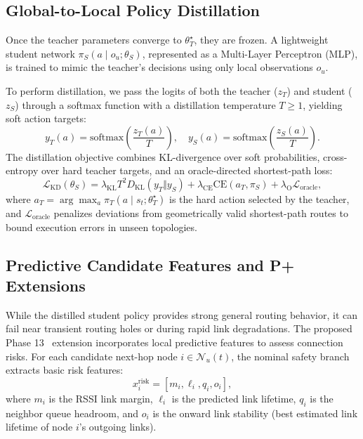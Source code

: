 \subsection{Global-to-Local Policy Distillation}
Once the teacher parameters converge to $\theta_T^\star$, they are frozen. A lightweight student network $\pi_S(a \mid o_u; \theta_S)$, represented as a Multi-Layer Perceptron (MLP), is trained to mimic the teacher's decisions using only local observations $o_u$. 

To perform distillation, we pass the logits of both the teacher ($z_T$) and student ($z_S$) through a softmax function with a distillation temperature $T \ge 1$, yielding soft action targets:
\begin{equation}
    y_T(a) = \mathrm{softmax}\left(\frac{z_T(a)}{T}\right), \quad y_S(a) = \mathrm{softmax}\left(\frac{z_S(a)}{T}\right).
\end{equation}
The distillation objective combines KL-divergence over soft probabilities, cross-entropy over hard teacher targets, and an oracle-directed shortest-path loss:
\begin{equation}
    \mathcal{L}_{\mathrm{KD}}(\theta_S) = \lambda_{\mathrm{KL}} T^2 D_{\mathrm{KL}}(y_T \Vert y_S) + \lambda_{\mathrm{CE}} \mathrm{CE}(a_T, \pi_S) + \lambda_{\mathrm{O}} \mathcal{L}_{\mathrm{oracle}},
\end{equation}
where $a_T = \arg\max_{a} \pi_T(a \mid s_t; \theta_T^\star)$ is the hard action selected by the teacher, and $\mathcal{L}_{\mathrm{oracle}}$ penalizes deviations from geometrically valid shortest-path routes to bound execution errors in unseen topologies.

\subsection{Predictive Candidate Features and P+ Extensions}
While the distilled student policy provides strong general routing behavior, it can fail near transient routing holes or during rapid link degradations. The proposed Phase 13 \method\ extension incorporates local predictive features to assess connection risks. For each candidate next-hop node $i \in \mathcal{N}_u(t)$, the nominal safety branch extracts basic risk features:
\begin{equation}
    x_i^{\mathrm{risk}} = [m_i, \ell_i, q_i, o_i],
\end{equation}
where $m_i$ is the RSSI link margin, $\ell_i$ is the predicted link lifetime, $q_i$ is the neighbor queue headroom, and $o_i$ is the onward link stability (best estimated link lifetime of node $i$'s outgoing links).

